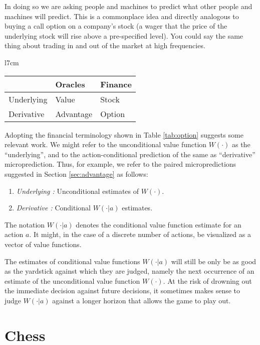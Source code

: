 In doing so we are asking people and machines to predict what other people and machines will predict. This is a commonplace idea and directly analogous to buying a call option on a company's stock (a wager that the price of the underlying stock will rise above a pre-specified level). You could say the same thing about trading in and out of the market at high frequencies.

\begin{wraptable}{l}{7cm}
\begin{tabular}{|l|l|l|}
\hline
               & Oracles      &  Finance \\
               \hline 
    Underlying & Value    &  Stock  \\
    Derivative & Advantage & Option  \\
    \hline
\end{tabular}
\caption{Analogy to finance}
\label{tab:option}
\end{wraptable}

Adopting the financial terminology shown in Table \ref{tab:option} suggests some relevant work. We might refer to the unconditional value function $W(\cdot)$ as the ``underlying'', and to the action-conditional prediction of the same as ``derivative'' microprediction. Thus, for example, we refer to the paired micropredictions suggested in Section \ref{sec:advantage} as follows: 
\begin{enumerate}
    \item {\em Underlying :} Unconditional estimates of $W(\cdot)$. 
    \item {\em Derivative :} Conditional $W(\cdot|a)$ estimates. 
\end{enumerate}

The notation $W(\cdot|a)$ denotes the conditional value function estimate for an action $a$. It might, in the case of a discrete number of actions, be visualized as a vector of value functions.

The estimates of conditional value functions $W(\cdot|a)$ will still be only be as good as the yardstick against which they are judged, namely the next occurrence of an estimate of the unconditional value function $W(\cdot)$. At the risk of drowning out the immediate decision against future decisions, it sometimes makes sense to judge $W(\cdot|a)$ against a longer horizon that allows the game to play out.  

\section{Chess}


